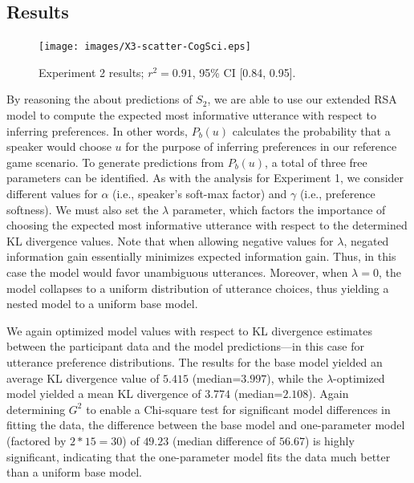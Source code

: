 \documentclass[10pt,a4paper]{article}
\begin{document}
\subsection{Results}

\begin{figure}[ht]
	\centering
	\texttt{[image: images/X3-scatter-CogSci.eps]}
	\caption{Experiment 2 results; $r^{2}=0.91$, 95\% CI [0.84, 0.95].}\label{exp2-results}
\end{figure}


By reasoning the about predictions of $S_2$, we are able to use our extended RSA model to compute the expected most informative utterance with respect to inferring preferences. In other words, $P_b(u)$ calculates the probability that a speaker would choose $u$ for the purpose of inferring preferences in our reference game scenario.
To generate predictions from $P_b(u)$, a total of three free parameters can be identified. 
As with the analysis for Experiment 1, we consider different values for $\alpha$ (i.e., speaker's soft-max factor) and $\gamma$ (i.e., preference softness). 
We must also set the $\lambda$ parameter, which factors the importance of choosing the expected most informative utterance with respect to the determined KL divergence values.
Note that when allowing negative values for $\lambda$, negated information gain essentially minimizes expected information gain.
Thus, in this case the model would favor unambiguous utterances. 
Moreover, when $\lambda=0$, the model collapses to a uniform distribution of utterance choices, thus yielding a nested model to a uniform base model. 

We again optimized model values with respect to KL divergence estimates between the participant data and the model predictions---in this case for utterance preference distributions. 
The results for the base model yielded an average KL divergence value of $5.415$ (median=$3.997$), while the $\lambda$-optimized model yielded a mean KL divergence of $3.774$ (median=$2.108$).
Again determining $G^2$ to enable a Chi-square test for significant model differences in fitting the data, the difference between the base model and one-parameter model (factored by $2*15=30$) of $49.23$ (median difference of $56.67$) is highly significant, indicating that the one-parameter model fits the data much better than a uniform base model. 
\end{document}
